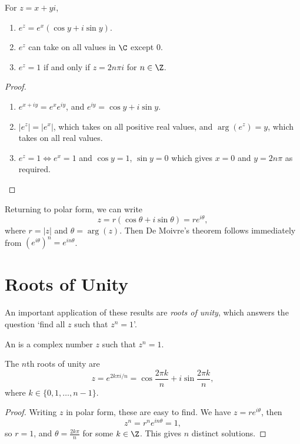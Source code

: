 \begin{proposition}
	For $z = x + yi$,
	\begin{enumerate}[label=(\roman*)]
		\item $e^z = e^x(\cos y + i \sin y)$.
		\item $e^z$ can take on all values in $\C$ except 0.
		\item $e^z = 1$ if and only if $z = 2 n \pi i$ for $n \in \Z$. 
	\end{enumerate}
\end{proposition}
\begin{proof}\begin{enumerate}[label=(\roman*)]
	\item $e^{x + iy} = e^x e^{iy}$, and $e^{iy} = \cos y + i \sin y$.
	\item $|e^z| = |e^x|$, which takes on all positive real values, and $\arg(e^z) = y$, which takes on all real values.
	\item $e^z = 1 \iff e^x = 1$ and $\cos y = 1$, $\sin y = 0$ which gives $x = 0$ and $y = 2 n \pi$ as required. \qedhere
\end{enumerate}
\end{proof}

Returning to polar form, we can write
$$
z = r(\cos \theta + i \sin \theta) = re^{i \theta},
$$
where $r = |z|$ and $\theta = \arg(z)$. 
Then De Moivre's theorem follows immediately from $(e^{i \theta})^n = e^{i n \theta}$.


\section{Roots of Unity}

An important application of these results are \emph{roots of unity}, which answers the question `find all $z$ such that $z^n = 1$'.

\begin{definition}
	An  is a complex number $z$ such that $z^n = 1$.
\end{definition}

\begin{proposition}
	The $n$th roots of unity are
	$$
	z = e^{2 k \pi i / n} = \cos \frac{2 \pi k}{n}+ i \sin \frac{2 \pi k}{n},
	$$
	where $k \in \{0, 1, \dots, n - 1\}$.
\end{proposition}
\begin{proof}
	Writing $z$ in polar form, these are easy to find. We have $z = re^{i \theta}$, then
$$
z^n = r^n e^{i n \theta} = 1,
$$
so $r = 1$, and $\theta = \frac{2 k \pi}{n}$ for some $k \in \Z$. This gives $n$ distinct solutions.
\end{proof}

